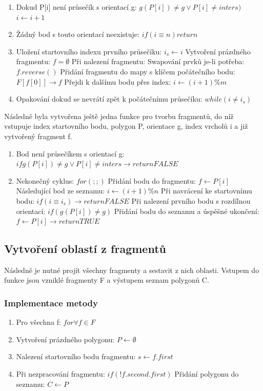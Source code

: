 \documentclass[a4paper, 12pt]{article}
\begin{document}
\begin{enumerate}
\item Dokud P[i] není průsečík s orientací g: $g(P[i]) \neq g \vee P[i] \neq inters )$
\subitem $i \leftarrow i + 1 $
\item Žádný bod s touto orientací neexistuje: $if (i \equiv n) return$
\item Uložení startovního indexu prvního průsečíku: $i_s \leftarrow i$
\subitem Vytvoření prázdného fragmentu: $f = \emptyset $
\subitem Při nalezení fragmentu: 
\subitem Swapování prvků je-li potřeba: $f.reverse()$
\subitem Přidání fragmentu do mapy s klíčem počátečního bodu: $F[f[0]] \rightarrow f$
\subitem Přejdi k dalšímu bodu přes index: $i \leftarrow (i+1)\% m$
\item Opakování dokud se nevrátí zpět k počátečnímu průsečíku: $ while (i \neq i_s)$
\end{enumerate}

Následně byla vytvořena ještě jedna funkce pro tvorbu fragmentů, do níž vstupuje index startovního bodu, polygon P, orientace g, index vrcholů i a již vytvořený fragment f.

\begin{enumerate}
\item Bod není průsečíkem s orientací g: $if g(P[i]) \neq g \vee P[i] \neq inters \rightarrow return FALSE$
\item Nekonečný cyklus: $for (;;)$
\subitem Přidání bodu do fragmentu: $f \leftarrow P[i]$
\subitem Následující bod ze seznamu: $i \leftarrow (i+1)\%n$
\subitem Při navrácení ke startovnímu bodu: $if (i \equiv i_s) \rightarrow return FALSE$
\subitem Při nalezení prvního bodu s rozdílnou orientací: $if (g(P[i]) \neq g)$
\subitem Přidání bodu do seznamu a úspěšné ukončení: $f \leftarrow P[i] \rightarrow return TRUE$
\end{enumerate}


\subsection{Vytvoření oblastí z fragmentů}
Následně je nutné projít všechny fragmenty a sestavit z nich oblasti. Vstupem do funkce jsou vzniklé fragmenty F a výstupem seznam polygonů C.

\subsubsection{Implementace metody}
\begin{enumerate}
\item Pro všechna f: $ for \forall f \in F$
\item Vytvoření prázdného polygonu: $P \leftarrow \emptyset$
\item Nalezení startovního bodu fragmentu: $s \leftarrow f.first$
\item Při nezpracování fragmentu: $if (!f.second.first)$
\subitem Přidání polygonu do seznamu: $C \leftarrow P$
\end{enumerate}
\end{document}
